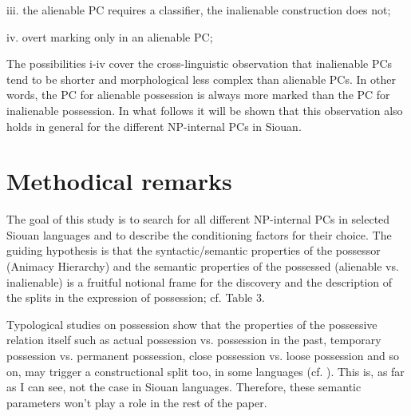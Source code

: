 \documentclass[output=paper]{LSP/langsci}
\begin{document}
iii.	the alienable PC requires a classifier, the inalienable construction does not;

iv.	overt marking only in an alienable PC;
\vspace{1em}

The possibilities i-iv cover the cross-linguistic observation that inalienable PCs tend to be shorter and morphological less complex than alienable PCs. In other words, the PC for alienable possession is always more marked than the PC for inalienable possession. In what follows it will be shown that this observation also holds in general for the different NP-internal PCs in Siouan.

\section{Methodical remarks}

The goal of this study is to search for all different NP-internal PCs in selected Siouan languages and to describe the conditioning factors for their choice. The guiding hypothesis is that the syntactic/semantic properties of the possessor (Animacy Hierarchy) and the semantic properties of the possessed (alienable vs. inalienable) is a fruitful notional frame for the discovery and the description of the splits in the expression of possession; cf. Table 3. 
	
Typological studies on possession show that the properties of the possessive relation itself such as actual possession vs. possession in the past, temporary possession vs. permanent possession, close possession vs. loose possession and so on, may trigger a constructional split too, in some languages (cf. \citealt[274-6]{Dixon2010}). This is, as far as I can see, not the case in Siouan languages. Therefore, these semantic parameters won't play a role in the rest of the paper. 
\end{document}
